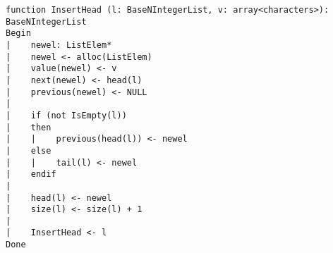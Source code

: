 \begin{lstlisting}[breaklines]
function InsertHead (l: BaseNIntegerList, v: array<characters>): BaseNIntegerList
Begin
|    newel: ListElem*
|    newel <- alloc(ListElem)
|    value(newel) <- v
|    next(newel) <- head(l)
|    previous(newel) <- NULL
|
|    if (not IsEmpty(l))
|    then
|    |    previous(head(l)) <- newel
|    else
|    |    tail(l) <- newel
|    endif
|
|    head(l) <- newel
|    size(l) <- size(l) + 1
|
|    InsertHead <- l
Done
\end{lstlisting}
